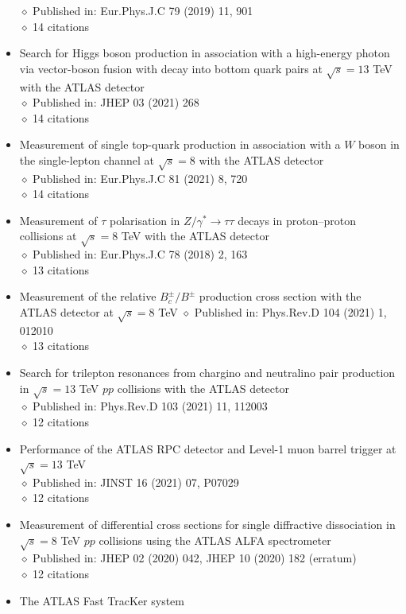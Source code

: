 \documentclass[margin, 10pt]{res} %
\begin{document}
\begin{resume}
\begin{itemize}
$\diamond$ Published in: Eur.Phys.J.C 79 (2019) 11, 901\\
$\diamond$ 14 citations
\item Search for Higgs boson production in association with a high-energy photon via vector-boson fusion with decay into bottom quark pairs at $\sqrt{s} = 13$ TeV with the ATLAS detector\\
$\diamond$ Published in: JHEP 03 (2021) 268\\
$\diamond$ 14 citations
\item Measurement of single top-quark production in association with a $W$ boson in the single-lepton channel at $\sqrt{s} = 8$ with the ATLAS detector\\
$\diamond$ Published in: Eur.Phys.J.C 81 (2021) 8, 720\\
$\diamond$ 14 citations
\item Measurement of $\tau$ polarisation in $Z/\gamma^{*} \rightarrow \tau\tau$ decays in proton–proton collisions at $\sqrt{s} = 8$ TeV with the ATLAS detector\\
$\diamond$ Published in: Eur.Phys.J.C 78 (2018) 2, 163\\
$\diamond$ 13 citations
\item Measurement of the relative $B^{\pm}_{c}/B^{\pm}$ production cross section with the ATLAS detector at $\sqrt{s} = 8$ TeV
$\diamond$ Published in: Phys.Rev.D 104 (2021) 1, 012010\\
$\diamond$ 13 citations
\item Search for trilepton resonances from chargino and neutralino pair production in $\sqrt{s} = 13$ TeV $pp$ collisions with the ATLAS detector\\
$\diamond$ Published in: Phys.Rev.D 103 (2021) 11, 112003\\
$\diamond$ 12 citations
\item Performance of the ATLAS RPC detector and Level-1 muon barrel trigger at $\sqrt{s} = 13$ TeV\\
$\diamond$ Published in: JINST 16 (2021) 07, P07029\\
$\diamond$ 12 citations
\item Measurement of differential cross sections for single diffractive dissociation in $\sqrt{s} = 8$ TeV $pp$ collisions using the ATLAS ALFA spectrometer\\
$\diamond$ Published in: JHEP 02 (2020) 042, JHEP 10 (2020) 182 (erratum)\\
$\diamond$ 12 citations
\item The ATLAS Fast TracKer system\\

\end{itemize}
\end{resume}
\end{document}
